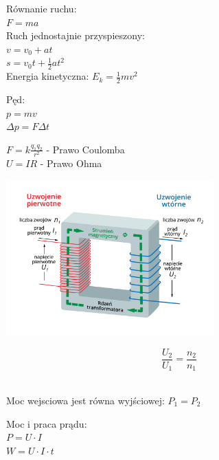 \documentclass[a4paper,10pt]{article}
\begin{document}
\pagestyle{empty} %

\begin{multicols}{2}

\begin{tcolorbox}[title=\textbf{Mechanika}, colframe=pastelblue, colback=white]
Równanie ruchu: \\
$F = ma$\\[6pt]
Ruch jednostajnie przyspieszony: \\
$v = v_0 + at$\\
$s = v_0t + \frac{1}{2}at^2$\\[6pt]
Energia kinetyczna: $E_k = \frac{1}{2}mv^2$

Pęd:\\
$p = m v$\\
$\Delta p = F \Delta t$
\end{tcolorbox}



\begin{tcolorbox}[title=\textbf{Elektryczność}, colframe=pastelpink, colback=white]
$F = k \displaystyle\frac{q_1 q_2}{r^2}$ - Prawo Coulomba \\
$U = IR$ -  Prawo Ohma \\
\begin{multicols}{2}
  \centering
   \includegraphics[width=0.6\textwidth]{transf.pdf}

  \columnbreak
  
  \centering
  $$\frac{U_2}{U_1} = \frac{n_2}{n_1}$$\\ \vspace{0.15cm}
  
  Moc wejsciowa jest równa wyjściowej: $P_1 = P_2$
\end{multicols}

Moc i praca prądu:\\
$P = U\cdot I$\\ 
$W = U\cdot I\cdot t$



\end{tcolorbox}
\end{multicols}
\end{document}
